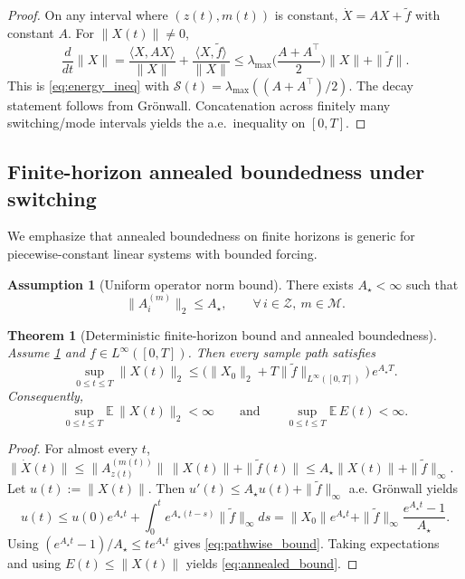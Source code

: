 \documentclass[12pt,a4paper]{article}
\newtheorem{theorem}{Theorem}
\theoremstyle{definition}
\newtheorem{assumption}{Assumption}
\theoremstyle{remark}
\begin{document}
\begin{proof}
	On any interval where $(z(t),m(t))$ is constant, $\dot X=AX+\widetilde f$ with constant $A$.
	For $\|X(t)\|\neq 0$,
	\[
	\frac{d}{dt}\|X\|
	=
	\frac{\langle X,AX\rangle}{\|X\|}+\frac{\langle X,\widetilde f\rangle}{\|X\|}
	\le
	\lambda_{\max}\!\Big(\frac{A+A^\top}{2}\Big)\|X\|+\|\widetilde f\|.
	\]
	This is \eqref{eq:energy_ineq} with $\mathcal{S}(t)=\lambda_{\max}((A+A^\top)/2)$.
	The decay statement follows from Gr\"onwall. Concatenation across finitely many switching/mode intervals yields the a.e.\ inequality on $[0,T]$.
\end{proof}


\subsection{Finite-horizon annealed boundedness under switching}
\label{subsec:annealed_bound}

We emphasize that annealed boundedness on finite horizons is generic for piecewise-constant linear systems with bounded forcing.

\begin{assumption}[Uniform operator norm bound]
	\label{ass:uniform_opnorm}
	There exists $A_\star<\infty$ such that
	\[
	\|A_i^{(m)}\|_2\le A_\star,\qquad \forall\, i\in\mathcal{Z},\ m\in\mathcal{M}.
	\]
\end{assumption}

\begin{theorem}[Deterministic finite-horizon bound and annealed boundedness]
	\label{thm:finite_horizon_bound}
	Assume \ref{ass:uniform_opnorm} and $f\in L^\infty([0,T])$. Then every sample path satisfies
	\begin{equation}\label{eq:pathwise_bound}
		\sup_{0\le t\le T}\|X(t)\|_2
		\le
		\Big(\|X_0\|_2 + T\|\widetilde f\|_{L^\infty([0,T])}\Big)\,e^{A_\star T}.
	\end{equation}
	Consequently,
	\begin{equation}\label{eq:annealed_bound}
		\sup_{0\le t\le T}\mathbb{E}\,\|X(t)\|_2 <\infty
		\qquad\text{and}\qquad
		\sup_{0\le t\le T}\mathbb{E}\,E(t) <\infty.
	\end{equation}
\end{theorem}

\begin{proof}
	For almost every $t$, $\|\dot X(t)\|\le \|A_{z(t)}^{(m(t))}\|\,\|X(t)\|+\|\widetilde f(t)\|\le A_\star \|X(t)\|+\|\widetilde f\|_\infty$.
	Let $u(t):=\|X(t)\|$. Then $u'(t)\le A_\star u(t)+\|\widetilde f\|_\infty$ a.e.
	Gr\"onwall yields
	\[
	u(t)\le u(0)e^{A_\star t}+\int_0^t e^{A_\star(t-s)}\|\widetilde f\|_\infty ds
	= \|X_0\|e^{A_\star t}+\|\widetilde f\|_\infty\frac{e^{A_\star t}-1}{A_\star}.
	\]
	Using $(e^{A_\star t}-1)/A_\star\le t e^{A_\star t}$ gives \eqref{eq:pathwise_bound}.
	Taking expectations and using $E(t)\le \|X(t)\|$ yields \eqref{eq:annealed_bound}.
\end{proof}
\end{document}
